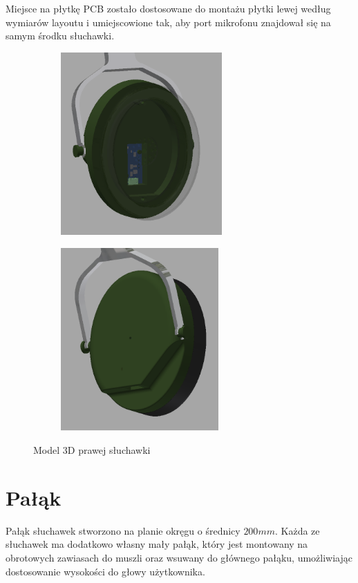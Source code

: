 Miejsce na płytkę PCB zostało dostosowane do montażu płytki lewej według wymiarów layoutu i umiejscowione tak, aby port mikrofonu znajdował się na samym środku słuchawki.

\begin{figure}[H]
	\centering
	\begin{subfigure}{.45\textwidth}
		\centering
		\includegraphics[height=7cm]{zdjecia/model/right_in.png}
	\end{subfigure}
	\begin{subfigure}{.45\textwidth}
		\centering
		\includegraphics[height=7cm]{zdjecia/model/right_out.png}
	\end{subfigure}
	\caption{\label{pic:prawa_sluchawka} Model 3D prawej słuchawki}
\end{figure}


\section{Pałąk}
\label{cha:model_palak}

Pałąk słuchawek stworzono na planie okręgu o średnicy $200mm$. Każda ze słuchawek ma dodatkowo własny mały pałąk, który jest montowany na obrotowych zawiasach do muszli oraz wsuwany do głównego pałąku, umożliwiając dostosowanie wysokości do głowy użytkownika.

